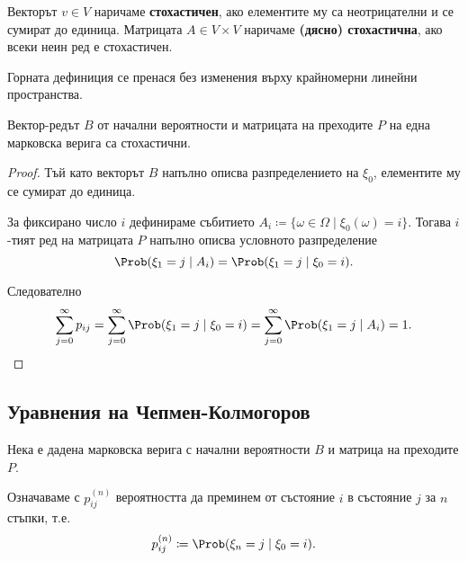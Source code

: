 \documentclass[numbers=endperiod, bibliography=totocnumbered]{scrartcl}
\begin{document}
\begin{definition}
  Векторът \( v \in V \) наричаме \textbf{стохастичен}, ако елементите му са неотрицателни и се сумират до единица. Матрицата \( A \in V \times V \) наричаме \textbf{(дясно) стохастична}, ако всеки неин ред е стохастичен.
\end{definition}

\begin{remark}
  Горната дефиниция се пренася без изменения върху крайномерни линейни пространства.
\end{remark}

\begin{proposition}
  Вектор-редът \( B \) от начални вероятности и матрицата на преходите \( P \) на една марковска верига са стохастични.
\end{proposition}
\begin{proof}
  Тъй като векторът \( B \) напълно описва разпределението на \( \xi_0 \), елементите му се сумират до единица.

  За фиксирано число \( i \) дефинираме събитието \( A_i \coloneqq \{ \omega \in \Omega \mid \xi_0(\omega) = i \} \). Тогава \( i \)-тият ред на матрицата \( P \) напълно описва условното разпределение
  \begin{equation*}
    \Prob(\xi_1 = j \mid A_i)
    =
    \Prob(\xi_1 = j \mid \xi_0 = i).
  \end{equation*}

  Следователно
  \begin{equation*}
    \sum_{j=0}^\infty p_{ij}
    =
    \sum_{j=0}^\infty \Prob(\xi_1 = j \mid \xi_0 = i)
    =
    \sum_{j=0}^\infty \Prob(\xi_1 = j \mid A_i)
    =
    1.
  \end{equation*}
\end{proof}

\subsection{Уравнения на Чепмен-Колмогоров}

Нека е дадена марковска верига с начални вероятности \( B \) и матрица на преходите \( P \).

Означаваме с \( p^{(n)}_{ij} \) вероятността да преминем от състояние \( i \) в състояние \( j \) за \( n \) стъпки, т.е.
\begin{equation*}
  p^{(n)}_{ij} \coloneqq \Prob(\xi_n = j \mid \xi_0 = i).
\end{equation*}
\end{document}
